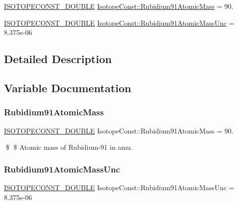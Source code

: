 \begin{DoxyCompactItemize}
\item 
\mbox{\hyperlink{group___isotope_const-_macros_ga8f45a7272ce02c0b4c65c44636ed719a}{I\+S\+O\+T\+O\+P\+E\+C\+O\+N\+S\+T\+\_\+\+D\+O\+U\+B\+LE}} \mbox{\hyperlink{group___isotope_const-_rubidium-_rb91_ga0fa5d9fd6e7926746a097f313423183b}{Isotope\+Const\+::\+Rubidium91\+Atomic\+Mass}} = 90.
\item 
\mbox{\hyperlink{group___isotope_const-_macros_ga8f45a7272ce02c0b4c65c44636ed719a}{I\+S\+O\+T\+O\+P\+E\+C\+O\+N\+S\+T\+\_\+\+D\+O\+U\+B\+LE}} \mbox{\hyperlink{group___isotope_const-_rubidium-_rb91_ga075c2f2013682092e2b07001ab820353}{Isotope\+Const\+::\+Rubidium91\+Atomic\+Mass\+Unc}} = 8.\+375e-\/06
\end{DoxyCompactItemize}


\subsection{Detailed Description}


\subsection{Variable Documentation}
\mbox{\label{group___isotope_const-_rubidium-_rb91_ga0fa5d9fd6e7926746a097f313423183b}} 
\subsubsection{\texorpdfstring{Rubidium91\+Atomic\+Mass}{Rubidium91AtomicMass}}
{\footnotesize\ttfamily \mbox{\hyperlink{group___isotope_const-_macros_ga8f45a7272ce02c0b4c65c44636ed719a}{I\+S\+O\+T\+O\+P\+E\+C\+O\+N\+S\+T\+\_\+\+D\+O\+U\+B\+LE}} Isotope\+Const\+::\+Rubidium91\+Atomic\+Mass = 90.}

\$ \$ Atomic mass of Rubidium-\/91 in amu. \mbox{\label{group___isotope_const-_rubidium-_rb91_ga075c2f2013682092e2b07001ab820353}} 
\subsubsection{\texorpdfstring{Rubidium91\+Atomic\+Mass\+Unc}{Rubidium91AtomicMassUnc}}
{\footnotesize\ttfamily \mbox{\hyperlink{group___isotope_const-_macros_ga8f45a7272ce02c0b4c65c44636ed719a}{I\+S\+O\+T\+O\+P\+E\+C\+O\+N\+S\+T\+\_\+\+D\+O\+U\+B\+LE}} Isotope\+Const\+::\+Rubidium91\+Atomic\+Mass\+Unc = 8.\+375e-\/06}

